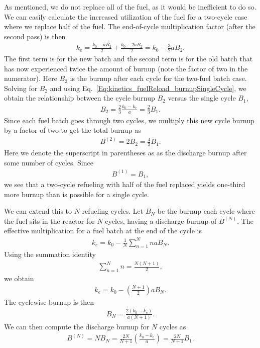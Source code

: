 As mentioned, we do not replace all of the fuel, as it would be inefficient to do so. We can easily calculate the increased utilization of the fuel for a two-cycle case where we replace half of the fuel. The end-of-cycle multiplication factor (after the second pass) is then
\begin{align}
  k_e = \frac{k_0 - a B_2 }{ 2 } + \frac{ k_0 - 2 a B_2 }{ 2 } = k_0 - \frac{3}{2} a B_2 .
\end{align}
The first term is for the new batch and the second term is for the old batch that has now experienced twice the amount of burnup (note the factor of two in the numerator). Here $B_2$ is the burnup after each cycle for the two-fuel batch case. Solving for $B_2$ and using Eq.~\eqref{Eq:kinetics_fuelReload_burnupSingleCycle}, we obtain the relationship between the cycle burnup $B_2$ versus the single cycle $B_1$,
\begin{align}
  B_2 = \frac{2}{3} \frac{k_0 - k_e}{a} = \frac{2}{3} B_1 .
\end{align}
Since each fuel batch goes through two cycles, we multiply this new cycle burnup by a factor of two to get the total burnup as
\begin{align}
  B^{(2)} = 2 B_2 = \frac{4}{3} B_1 .
\end{align}
Here we denote the superscript in parentheses as as the discharge burnup after some number of cycles. Since
\begin{align}
  B^{(1)} = B_1,
\end{align}
we see that a two-cycle refueling with half of the fuel replaced yields one-third more burnup than is possible for a single cycle.

We can extend this to $N$ refueling cycles. Let $B_N$ be the burnup each cycle where the fuel sits in the reactor for $N$ cycles, having a discharge burnup of $B^{(N)}$. The effective multiplication for a fuel batch at the end of the cycle is
\begin{align}
  k_e = k_0 - \frac{1}{N} \sum_{n=1}^N n a B_N . \label{Eq:kinetics_EOCmultiplication_NCycle_Sum}
\end{align}
Using the summation identity
\begin{align}
  \sum_{n=1}^N n = \frac{N(N+1)}{2}, \nonumber
\end{align}
we obtain
\begin{align}
  k_e = k_0 - \left( \frac{N+1}{2} \right) a B_N .  \label{Eq:kinetics_EOCmultiplication_NCycle}
\end{align}
The cyclewise burnup is then
\begin{align}
  B_N = \frac{ 2 ( k_0 - k_e ) }{ a (N+1) } . \label{Eq:kinetics_cycleBurnup_NCycle}
\end{align}
We can then compute the discharge burnup for $N$ cycles as
\begin{align}
  B^{(N)} = N B_N = \frac{ 2 N }{ N + 1 } \left( \frac{ k_0 - k_e }{ a } \right) = \frac{ 2 N }{ N + 1 } B_1.
\end{align}

